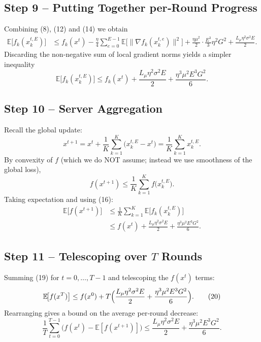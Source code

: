 \documentclass[11pt]{article}
\newcommand{\E}{\mathbb{E}}
\begin{document}
\subsection*{Step 9 – Putting Together per‑Round Progress}
Combining (8), (12) and (14) we obtain
\begin{align}
    \E\!\bigl[f_k(x_{k}^{t,E})\bigr]
    &\le f_k(x^{t})
    -\frac{\eta}{4}\sum_{e=0}^{E-1}\E\!\bigl[\|\nabla f_k(x_{k}^{t,e})\|^{2}\bigr]
    +\frac{\eta\mu^{2}}{2}\cdot\frac{E^{3}}{3}\eta^{2}G^{2}
    +\frac{L_{\mu}\eta^{2}\sigma^{2}E}{2}. \tag{15}
\end{align}
Discarding the non‑negative sum of local gradient norms yields a simpler inequality
\[
    \E\!\bigl[f_k(x_{k}^{t,E})\bigr]\le
    f_k(x^{t})+\frac{L_{\mu}\eta^{2}\sigma^{2}E}{2}
    +\frac{\eta^{3}\mu^{2}E^{3}G^{2}}{6}. \tag{16}
\]

\subsection*{Step 10 – Server Aggregation}
Recall the global update:
\[
    x^{t+1}=x^{t}+\frac{1}{K}\sum_{k=1}^{K}\bigl(x_{k}^{t,E}-x^{t}\bigr)
          =\frac{1}{K}\sum_{k=1}^{K}x_{k}^{t,E}. \tag{17}
\]
By convexity of $f$ (which we do NOT assume; instead we use smoothness of the global loss),
\[
    f(x^{t+1})\le \frac{1}{K}\sum_{k=1}^{K}f\!\bigl(x_{k}^{t,E}\bigr). \tag{18}
\]
Taking expectation and using (16):
\begin{align}
    \E\!\bigl[f(x^{t+1})\bigr]
    &\le \frac{1}{K}\sum_{k=1}^{K}\E\!\bigl[f_k(x_{k}^{t,E})\bigr] \nonumber\\
    &\le f(x^{t})+\frac{L_{\mu}\eta^{2}\sigma^{2}E}{2}
      +\frac{\eta^{3}\mu^{2}E^{3}G^{2}}{6}. \tag{19}
\end{align}

\subsection*{Step 11 – Telescoping over $T$ Rounds}
Summing (19) for $t=0,\dots,T-1$ and telescoping the $f(x^{t})$ terms:
\[
    \E\!\bigl[f(x^{T})\bigr]\le f(x^{0})
    +T\Bigl(\frac{L_{\mu}\eta^{2}\sigma^{2}E}{2}
    +\frac{\eta^{3}\mu^{2}E^{3}G^{2}}{6}\Bigr). \tag{20}
\]
Rearranging gives a bound on the average per‑round decrease:
\[
    \frac{1}{T}\sum_{t=0}^{T-1}\bigl(f(x^{t})- \E[f(x^{t+1})]\bigr)
    \le
    \frac{L_{\mu}\eta^{2}\sigma^{2}E}{2}
    +\frac{\eta^{3}\mu^{2}E^{3}G^{2}}{6}. \tag{21}
\]
\end{document}
